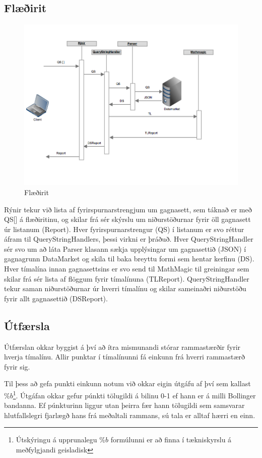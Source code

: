 \documentclass{article}
\begin{document}
\subsection{Flæðirit}
\label{sec:flow_chart}

\begin{figure}[H]
  \centering
  \includegraphics[width=.75\textwidth]{rynir_sequence-2.png} 
  \caption{Flæðirit} 
\end{figure}

Rýnir tekur við lista af fyrirspurnarstrengjum um gagnasett, sem táknað er með
QS[] á flæðiritinu, og skilar frá sér skýrslu um niðurstöðurnar fyrir öll
gagnasett úr listanum (Report). Hver fyrirspurnarstrengur (QS) í listanum er svo
réttur áfram til QueryStringHandlers, þessi virkni er þráðuð. Hver
QueryStringHandler sér svo um að láta Parser klasann sækja upplýsingar um
gagnasettið (JSON) í gagnagrunn DataMarket og skila til baka breyttu formi sem
hentar kerfinu (DS). Hver tímalína innan gagnasettsins er svo send til MathMagic
til greiningar sem skilar frá sér lista af flöggum fyrir tímalínuna (TLReport).
QueryStringHandler tekur saman niðurstöðurnar úr hverri tímalínu og skilar
sameinaðri niðurstöðu fyrir allt gagnasettið (DSReport).

\subsection{Útfærsla}
\label{sec:imp_our}

Útfærslan okkar byggist á því að ítra mismunandi stórar rammastærðir fyrir
hverja tímalínu.
Allir punktar í tímalínunni fá einkunn frá hverri rammastærð fyrir sig. 

Til þess að gefa punkti einkunn notum við okkar eigin útgáfu af því sem kallast $\%b$\footnote[1]{Útskýringu á upprunalegu $\%b$ formúlunni er að finna í tækniskyrslu á meðfylgjandi geisladisk}. 
Útgáfan okkar gefur púnkti tölugildi á bilinu 0-1 ef hann er á milli Bollinger bandanna.
Ef púnkturinn liggur utan þeirra fær hann tölugildi sem samsvarar hlutfallslegri fjarlægð hans frá meðaltali rammans, 
sú tala er alltaf hærri en einn.
\end{document}
